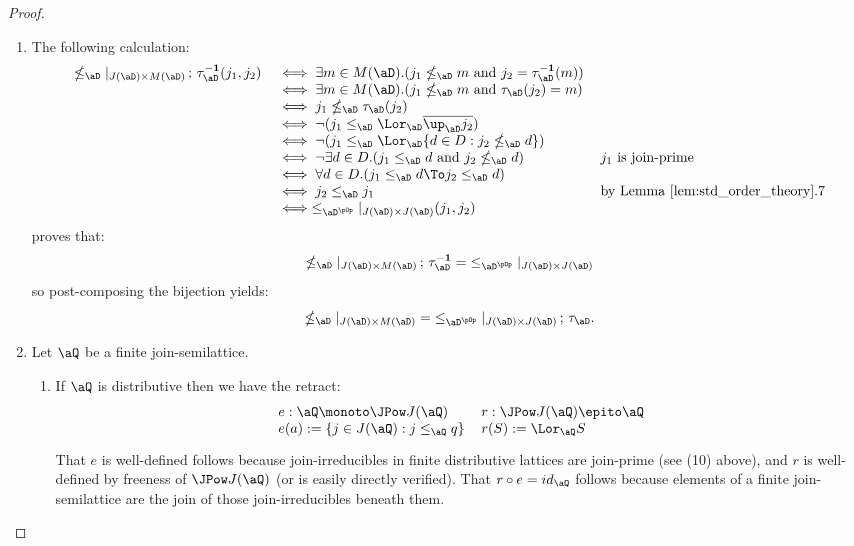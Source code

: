 \documentclass{article}
\begin{document}
\begin{proof}
\begin{enumerate}
\item
The following calculation:
\[
\begin{tabular}{lll}
$\nleq_\aD |_{J(\aD) \times M(\aD)} \, ;\, \tau_\aD^{\bf-1}(j_1,j_2)$
&
$\iff \exists m \in M(\aD).( j_1 \nleq_\aD m \text{ and } j_2 = \tau_\aD^{\bf-1}(m) )$
\\&
$\iff \exists m \in M(\aD).( j_1 \nleq_\aD m \text{ and } \tau_\aD(j_2) = m)$
\\&
$\iff j_1 \nleq_\aD \tau_\aD(j_2)$
\\&
$\iff \neg(j_1 \leq_\aD \Lor_\aD \overline{\up_\aD j_2})$
\\&
$\iff \neg(j_1 \leq_\aD \Lor_\aD \{ d \in D : j_2 \nleq_\aD d \})$
\\&
$\iff \neg\exists d \in D.(j_1 \leq_\aD d \text{ and } j_2 \nleq_\aD d )$
& $j_1$ is join-prime
\\&
$\iff \forall d \in D.( j_1 \leq_\aD d \To j_2 \leq_\aD d)$
\\&
$\iff j_2 \leq_\aD j_1$
& by Lemma \ref{lem:std_order_theory}.7
\\&
$\iff \leq_{\aD^{\pOp}} |_{J(\aD) \times J(\aD)} (j_1,j_2)$
\end{tabular}
\]
proves that:
\[
\nleq_\aD |_{J(\aD) \times M(\aD)} \, ; \, \tau_\aD^{\bf-1}
= \; \leq_{\aD^{\pOp}} |_{J(\aD) \times J(\aD)}
\]
so post-composing the bijection yields:
\[
\nleq_\aD |_{J(\aD) \times M(\aD)}
= \; \leq_{\aD^{\pOp}} |_{J(\aD) \times J(\aD)} \, ; \, \tau_{\aD}.
\]

\item
Let $\aQ$ be a finite join-semilattice. 

\begin{enumerate}
\item
If $\aQ$ is distributive then we have the retract:
\[
\begin{tabular}{ll}
$e : \aQ \monoto \JPow J(\aQ)$
& $r : \JPow J(\aQ) \epito \aQ$
\\
$e(a) := \{ j \in J(\aQ) : j \leq_\aQ q \}$
& $r(S) := \Lor_\aQ S$
\\[0.5ex]
\end{tabular}
\]
That $e$ is well-defined follows because join-irreducibles in finite distributive lattices are join-prime (see (10) above), and $r$ is well-defined by freeness of $\JPow J(\aQ)$ (or is easily directly verified). That $r \circ e = id_\aQ$ follows because elements of a finite join-semilattice are the join of those join-irreducibles beneath them. 



\end{enumerate}
\end{enumerate}
\end{proof}
\end{document}
